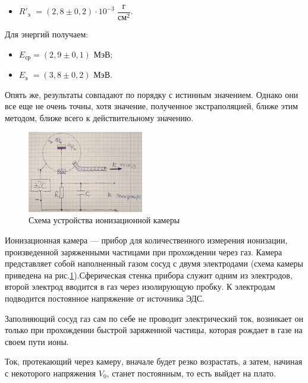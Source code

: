 \begin{enumerate}
\begin{itemize}
			
			\item $R'_\text{э} \,\, = (2,8 \pm 0,2) \cdot 10^{-3} \;\dfrac{\text{г}}{\text{см}^2}$.
		\end{itemize}
		
		Для энергий получаем:
		\begin{itemize}
			\item $E_\text{ср} = (2,9 \pm 0,1) \text{ МэВ}$;
			
			\item $E_\text{э} \,\, = (3,8 \pm 0,2) \text{ МэВ}$.
		\end{itemize}
	
		Опять же, результаты совпадают по порядку с истинным значением. Однако они все еще не очень точны, хотя значение, полученное экстраполяцией, ближе этим методом, ближе всего к действительному значению. 
	\end{enumerate}

	\newpage
	
	\begin{figure}
		\centering
		\includegraphics[width=0.45\textwidth]{Pictures/IonizationChamber}
		\caption{Схема устройства ионизационной камеры}
		\label{AlphaParticles_IonizationChamber}
	\end{figure}

	Ионизационная камера — прибор для количественного измерения ионизации, произведенной заряженными частицами при прохождении через газ. Камера представляет собой наполненный газом сосуд с двумя электродами (схема камеры приведена на рис.\ref{AlphaParticles_IonizationChamber}).Сферическая стенка прибора служит одним из электродов, второй электрод вводится в газ через изолирующую пробку. К электродам подводится постоянное напряжение от источника ЭДС.

	
	Заполняющий сосуд газ сам по себе не проводит электрический ток, возникает он только при прохождении быстрой заряженной частицы, которая рождает в газе на своем пути ионы.

	
	Ток, протекающий через камеру, вначале будет резко возрастать, а затем, начиная с некоторого напряжения $V_0$, станет постоянным, то есть выйдет на плато.
	
